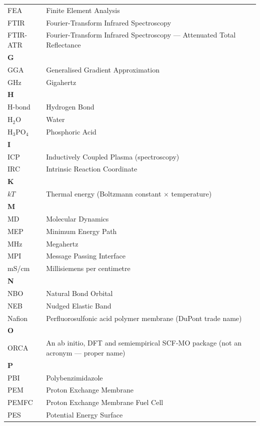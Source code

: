 \documentclass[12pt,a4paper]{report}
\begin{document}
\begin{center}
\begin{longtable}{p{2.5cm} p{12cm}}
\hline
FEA & Finite Element Analysis \\
FTIR & Fourier-Transform Infrared Spectroscopy \\
FTIR-ATR & Fourier-Transform Infrared Spectroscopy — Attenuated Total Reflectance \\
\hline
\multicolumn{2}{l}{\textbf{G}} \\
\hline
GGA & Generalised Gradient Approximation \\
GHz & Gigahertz \\
\hline
\multicolumn{2}{l}{\textbf{H}} \\
\hline
H-bond & Hydrogen Bond \\
H\(_2\)O & Water \\
H\(_3\)PO\(_4\) & Phosphoric Acid \\
\hline
\multicolumn{2}{l}{\textbf{I}} \\
\hline
ICP & Inductively Coupled Plasma (spectroscopy) \\
IRC & Intrinsic Reaction Coordinate \\
\hline
\multicolumn{2}{l}{\textbf{K}} \\
\hline
\(kT\) & Thermal energy (Boltzmann constant \(\times\) temperature) \\
\hline
\multicolumn{2}{l}{\textbf{M}} \\
\hline
MD & Molecular Dynamics \\
MEP & Minimum Energy Path \\
MHz & Megahertz \\
MPI & Message Passing Interface \\
mS/cm & Millisiemens per centimetre \\
\hline
\multicolumn{2}{l}{\textbf{N}} \\
\hline
NBO & Natural Bond Orbital \\
NEB & Nudged Elastic Band \\
Nafion & Perfluorosulfonic acid polymer membrane (DuPont trade name) \\
\hline
\multicolumn{2}{l}{\textbf{O}} \\
\hline
ORCA & An ab initio, DFT and semiempirical SCF-MO package (not an acronym — proper name) \\
\hline
\multicolumn{2}{l}{\textbf{P}} \\
\hline
PBI & Polybenzimidazole \\
PEM & Proton Exchange Membrane \\
PEMFC & Proton Exchange Membrane Fuel Cell \\
PES & Potential Energy Surface \\

\end{longtable}
\end{center}
\end{document}
